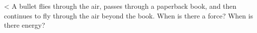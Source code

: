 <%
A bullet flies through the air, passes through a
paperback book, and then continues to fly through the air
beyond the book. When is there a force? When is there energy?
